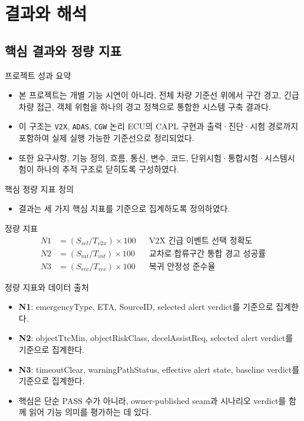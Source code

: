 \documentclass[aspectratio=169,10pt]{beamer}
\begin{document}
\section{결과와 해석}
\subsection{핵심 결과와 정량 지표}

\begin{frame}{프로젝트 성과 요약}
\begin{itemize}
  \item 본 프로젝트는 개별 기능 시연이 아니라, 전체 차량 기준선 위에서 구간 경고, 긴급차량 접근, 객체 위험을 하나의 경고 정책으로 통합한 시스템 구축 결과다.
  \item 이 구조는 \texttt{V2X}, \texttt{ADAS}, \texttt{CGW} 논리 ECU의 CAPL 구현과 출력·진단·시험 경로까지 포함하여 실제 실행 가능한 기준선으로 정리되었다.
  \item 또한 요구사항, 기능 정의, 흐름, 통신, 변수, 코드, 단위시험·통합시험·시스템시험이 하나의 추적 구조로 닫히도록 구성하였다.
\end{itemize}
\end{frame}

\begin{frame}{핵심 정량 지표 정의}
\begin{itemize}
  \item 결과는 세 가지 핵심 지표를 기준으로 집계하도록 정의하였다.
\end{itemize}
\begin{block}{정량 지표}
\[
\begin{aligned}
N1&=(S_{sel}/T_{v2x})\times100 && \text{V2X 긴급 이벤트 선택 정확도}\\
N2&=(S_{int}/T_{int})\times100 && \text{교차로·합류구간 통합 경고 성공률}\\
N3&=(S_{rec}/T_{rec})\times100 && \text{복귀 안정성 준수율}
\end{aligned}
\]
\end{block}
\end{frame}

\begin{frame}{정량 지표와 데이터 출처}
\begin{itemize}
  \item \textbf{N1}: emergencyType, ETA, SourceID, selected alert verdict를 기준으로 집계한다.
  \item \textbf{N2}: objectTtcMin, objectRiskClass, decelAssistReq, selected alert verdict를 기준으로 집계한다.
  \item \textbf{N3}: timeoutClear, warningPathStatus, effective alert state, baseline verdict를 기준으로 집계한다.
  \item 핵심은 단순 PASS 수가 아니라, owner-published seam과 시나리오 verdict를 함께 읽어 기능 의미를 평가하는 데 있다.
\end{itemize}
\end{frame}
\end{document}
